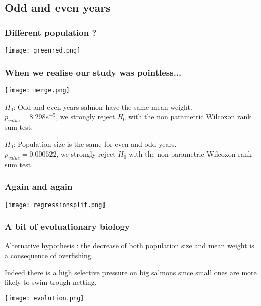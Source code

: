 \documentclass[10pt]{beamer}
\begin{document}
\subsection{Odd and even years}
\begin{frame}	
\frametitle{Different population ?}
	\begin{center}
       \texttt{[image: greenred.png]}
	\end{center}
\end{frame}

\begin{frame}	
\frametitle{When we realise our study was pointless...}
	\begin{center}
       \texttt{[image: merge.png]}
	\end{center}
\begin{scriptsize}
\begin{center}
 $H_0$: Odd and even years salmon have the same mean weight. \\
 $p_{value} = 8.298e^{-5}$, we strongly reject $H_0$ with the non parametric Wilcoxon rank sum test.
\end{center}
\begin{center}
$H_0$: Population size is the same for even and odd years. \\
$p_{value} = 0.000522$, we strongly reject $H_0$ with the non parametric Wilcoxon rank sum test.
\end{center}
\end{scriptsize}
\end{frame}

\begin{frame}	
\frametitle{Again and again}
	\begin{center}
       \texttt{[image: regressionsplit.png]}
	\end{center}
\end{frame}

\begin{frame}	
\frametitle{A bit of evoluationary biology}
\begin{center}
Alternative hypothesis : the decrease of both population size and mean weight is a consequence of overfishing.
\end{center}
\begin{center}
Indeed there is a high selective pressure on big salmons since small ones are more likely to swim trough netting.
\end{center} 
\begin{center}
       \texttt{[image: evolution.png]}
	\end{center}
\end{frame}
\end{document}
